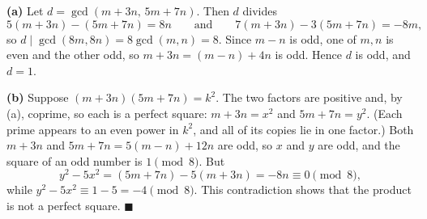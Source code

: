 \textbf{(a)} Let $d=\gcd(m+3n,\,5m+7n)$. Then $d$ divides
\[5(m+3n)-(5m+7n)=8n\qquad\text{and}\qquad 7(m+3n)-3(5m+7n)=-8m,\]
so $d\mid\gcd(8m,8n)=8\gcd(m,n)=8$. Since $m-n$ is odd, one of $m,n$ is even and the other odd, so $m+3n=(m-n)+4n$ is odd. Hence $d$ is odd, and $d=1$.

\textbf{(b)} Suppose $(m+3n)(5m+7n)=k^2$. The two factors are positive and, by (a), coprime, so each is a perfect square: $m+3n=x^2$ and $5m+7n=y^2$. (Each prime appears to an even power in $k^2$, and all of its copies lie in one factor.) Both $m+3n$ and $5m+7n=5(m-n)+12n$ are odd, so $x$ and $y$ are odd, and the square of an odd number is $1\pmod8$. But
\[y^2-5x^2=(5m+7n)-5(m+3n)=-8n\equiv0\pmod8,\]
while $y^2-5x^2\equiv1-5=-4\pmod8$. This contradiction shows that the product is not a perfect square. $\blacksquare$
